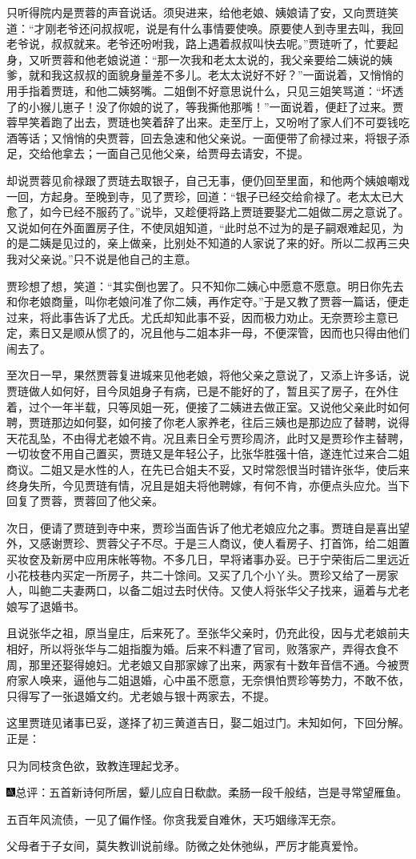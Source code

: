 只听得院内是贾蓉的声音说话。须臾进来，给他老娘、姨娘请了安，又向贾琏笑道：“才刚老爷还问叔叔呢，说是有什么事情要使唤。原要使人到寺里去叫，我回老爷说，叔叔就来。老爷还吩咐我，路上遇着叔叔叫快去呢。”贾琏听了，忙要起身，又听贾蓉和他老娘说道：“那一次我和老太太说的，我父亲要给二姨说的姨爹，就和我这叔叔的面貌身量差不多儿。老太太说好不好？”一面说着，又悄悄的用手指着贾琏，和他二姨努嘴。二姐倒不好意思说什么，只见三姐笑骂道：“坏透了的小猴儿崽子！没了你娘的说了，等我撕他那嘴！”一面说着，便赶了过来。贾蓉早笑着跑了出去，贾琏也笑着辞了出来。走至厅上，又吩咐了家人们不可耍钱吃酒等话；又悄悄的央贾蓉，回去急速和他父亲说。一面便带了俞禄过来，将银子添足，交给他拿去；一面自己见他父亲，给贾母去请安，不提。

却说贾蓉见俞禄跟了贾琏去取银子，自己无事，便仍回至里面，和他两个姨娘嘲戏一回，方起身。至晚到寺，见了贾珍，回道：“银子已经交给俞禄了。老太太已大愈了，如今已经不服药了。”说毕，又趁便将路上贾琏要娶尤二姐做二房之意说了。又说如何在外面置房子住，不使凤姐知道，“此时总不过为的是子嗣艰难起见，为的是二姨是见过的，亲上做亲，比别处不知道的人家说了来的好。所以二叔再三央我对父亲说。”只不说是他自己的主意。

贾珍想了想，笑道：“其实倒也罢了。只不知你二姨心中愿意不愿意。明日你先去和你老娘商量，叫你老娘问准了你二姨，再作定夺。”于是又教了贾蓉一篇话，便走过来，将此事告诉了尤氏。尤氏却知此事不妥，因而极力劝止。无奈贾珍主意已定，素日又是顺从惯了的，况且他与二姐本非一母，不便深管，因而也只得由他们闹去了。

至次日一早，果然贾蓉复进城来见他老娘，将他父亲之意说了，又添上许多话，说贾琏做人如何好，目今凤姐身子有病，已是不能好的了，暂且买了房子，在外住着，过个一年半载，只等凤姐一死，便接了二姨进去做正室。又说他父亲此时如何聘，贾琏那边如何娶，如何接了你老人家养老，往后三姨也是那边应了替聘，说得天花乱坠，不由得尤老娘不肯。况且素日全亏贾珍周济，此时又是贾珍作主替聘，一切妆奁不用自己置买，贾琏又是年轻公子，比张华胜强十倍，遂连忙过来合二姐商议。二姐又是水性的人，在先已合姐夫不妥，又时常怨恨当时错许张华，使后来终身失所，今见贾琏有情，况且是姐夫将他聘嫁，有何不肯，亦便点头应允。当下回复了贾蓉，贾蓉回了他父亲。

次日，便请了贾琏到寺中来，贾珍当面告诉了他尤老娘应允之事。贾琏自是喜出望外，又感谢贾珍、贾蓉父子不尽。于是三人商议，使人看房子、打首饰，给二姐置买妆奁及新房中应用床帐等物。不多几日，早将诸事办妥。已于宁荣街后二里远近小花枝巷内买定一所房子，共二十馀间。又买了几个小丫头。贾珍又给了一房家人，叫鲍二夫妻两口，以备二姐过去时伏侍。又使人将张华父子找来，逼着与尤老娘写了退婚书。

且说张华之祖，原当皇庄，后来死了。至张华父亲时，仍充此役，因与尤老娘前夫相好，所以将张华与二姐指腹为婚。后来不料遭了官司，败落家产，弄得衣食不周，那里还娶得媳妇。尤老娘又自那家嫁了出来，两家有十数年音信不通。今被贾府家人唤来，逼他与二姐退婚，心中虽不愿意，无奈惧怕贾珍等势力，不敢不依，只得写了一张退婚文约。尤老娘与银十两家去，不提。

这里贾琏见诸事已妥，遂择了初三黄道吉日，娶二姐过门。未知如何，下回分解。正是：

只为同枝贪色欲，致教连理起戈矛。

{\includegraphics[width=3mm]{../Images/00005}\kaishu 总评：五首新诗何所居，颦儿应自日欷}歔{。柔肠一段千般结，岂是寻常望雁鱼。}

{\kaishu 五百年风流债，一见了偏作怪。你贪我爱自难休，天巧姻缘浑无奈。}

{\kaishu 父母者于子女间，莫失教训说前缘。防微之处休弛纵，严厉才能真爱怜。}
